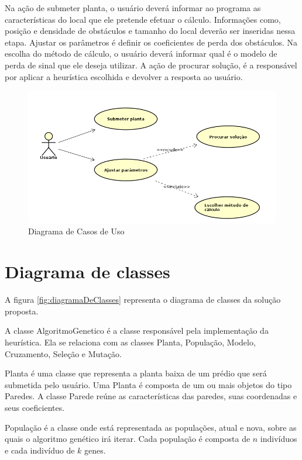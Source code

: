 \documentclass[tc,twoside]{iiufrgs}
\begin{document}
Na ação de submeter planta, o usuário deverá informar ao programa as características do local que ele pretende efetuar o cálculo. Informações como, posição e densidade de obstáculos e tamanho do local deverão ser inseridas nessa etapa. Ajustar os parâmetros é definir os coeficientes de perda dos obstáculos. Na escolha do método de cálculo, o usuário deverá informar qual é o modelo de perda de sinal que ele deseja utilizar. A ação de procurar solução, é a responsável por aplicar a heurística escolhida e devolver a resposta ao usuário.

\begin{figure}[h]
\centering
\includegraphics[scale=0.55]{img/casosDeUso.png}
\caption{Diagrama de Casos de Uso}
\label{fig:casosDeUso}
\end{figure}

\section{Diagrama de classes}

A figura \ref{fig:diagramaDeClasses} representa o diagrama de classes da solução proposta. 

A classe AlgoritmoGenetico é a classe responsável pela implementação da heurística. Ela se relaciona com as classes Planta, População, Modelo, Cruzamento, Seleção e Mutação.

Planta é uma classe que representa a planta baixa de um prédio que será submetida pelo usuário. Uma Planta é composta de um ou mais objetos do tipo Paredes. A classe Parede reúne as características das paredes, suas coordenadas e seus coeficientes. 

População é a classe onde está representada as populações, atual e nova, sobre as quais o algoritmo genético irá iterar. Cada população é composta de $n$ indivíduos e cada indivíduo de $k$ genes. 
\end{document}
